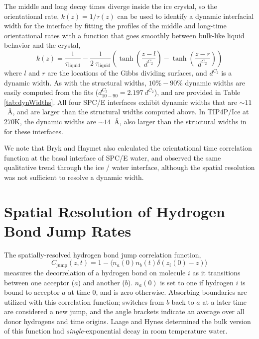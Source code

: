 The middle and long decay times diverge inside the ice crystal, so the
orientational rate, $k(z) = 1 / \tau(z)$ can be used to identify a
dynamic interfacial width for the interface by fitting the profiles of
the middle and long-time orientational rates with a function that goes
smoothly between bulk-like liquid behavior and the crystal,
\begin{equation}\label{tauFit}
  k(z) = \frac{1}{\tau_\mathrm{liquid}} - \frac{1}{2~\tau_\mathrm{liquid}} \left(
      \tanh \left( \frac{z-l}{d^{C_2}} \right) - \tanh \left( \frac{z-r}{d^{C_2}} \right) \right)
\end{equation}
where $l$ and $r$ are the locations of the Gibbs dividing surfaces,
and $d^{C_2}$ is a dynamic width.  As with the structural widths,
$10\%-90\%$ dynamic widths are easily computed from the fits
($d_\mathrm{10-90}^{C_2} = 2.197~d^{C_2}$), and are provided in Table
\ref{tab:dynWidths}. All four SPC/E interfaces exhibit dynamic widths
that are $\sim 11$~\AA, and are larger than the structural widths
computed above.  In TIP4P/Ice at 270K, the dynamic widths are
$\sim 14$~\AA, also larger than the structural widths in for these
interfaces.

We note that Bryk and Haymet also calculated the orientational time
correlation function at the basal interface of SPC/E
water,\cite{Bryk2002} and observed the same qualitative trend through
the ice / water interface, although the spatial resolution was not
sufficient to resolve a dynamic width.
 
\section{Spatial Resolution of Hydrogen Bond Jump Rates}
The spatially-resolved hydrogen bond jump correlation function,
\begin{equation}\label{jump}
C_\mathrm{jump}(z,t) = 1 - \langle n_a(0) n_b(t) \delta(z_i(0) - z) \rangle
\end{equation}
measures the decorrelation of a hydrogen bond on molecule $i$ as it
transitions between one acceptor ($a$) and another ($b$). $n_a(0)$ is
set to one if hydrogen $i$ is bound to acceptor $a$ at time $0$, and
is zero otherwise.  Absorbing boundaries are utilized with this
correlation function; switches from $b$ back to $a$ at a later time
are considered a new jump, and the angle brackets indicate an average
over all donor hydrogens and time origins. Laage and Hynes determined
the bulk version of this function had \textit{single}-exponential
decay in room temperature water.

